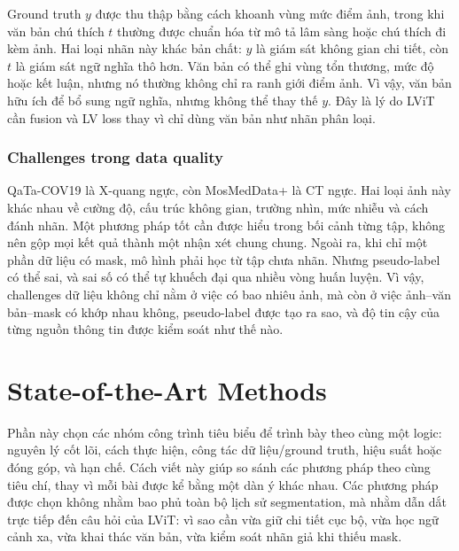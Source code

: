 Ground truth \(y\) được thu thập bằng cách khoanh vùng mức điểm ảnh, trong khi văn bản chú thích \(t\) thường được chuẩn hóa từ mô tả lâm sàng hoặc chú thích đi kèm ảnh. Hai loại nhãn này khác bản chất: \(y\) là giám sát không gian chi tiết, còn \(t\) là giám sát ngữ nghĩa thô hơn. Văn bản có thể ghi vùng tổn thương, mức độ hoặc kết luận, nhưng nó thường không chỉ ra ranh giới điểm ảnh. Vì vậy, văn bản hữu ích để bổ sung ngữ nghĩa, nhưng không thể thay thế \(y\). Đây là lý do LViT cần fusion và LV loss thay vì chỉ dùng văn bản như nhãn phân loại.

\subsubsection{Challenges trong data quality}

QaTa-COV19 là X-quang ngực, còn MosMedData+ là CT ngực. Hai loại ảnh này khác nhau về cường độ, cấu trúc không gian, trường nhìn, mức nhiễu và cách đánh nhãn. Một phương pháp tốt cần được hiểu trong bối cảnh từng tập, không nên gộp mọi kết quả thành một nhận xét chung chung. Ngoài ra, khi chỉ một phần dữ liệu có mask, mô hình phải học từ tập chưa nhãn. Nhưng pseudo-label có thể sai, và sai số có thể tự khuếch đại qua nhiều vòng huấn luyện. Vì vậy, challenges dữ liệu không chỉ nằm ở việc có bao nhiêu ảnh, mà còn ở việc ảnh--văn bản--mask có khớp nhau không, pseudo-label được tạo ra sao, và độ tin cậy của từng nguồn thông tin được kiểm soát như thế nào.

\section{State-of-the-Art Methods}

Phần này chọn các nhóm công trình tiêu biểu để trình bày theo cùng một logic: nguyên lý cốt lõi, cách thực hiện, công tác dữ liệu/ground truth, hiệu suất hoặc đóng góp, và hạn chế. Cách viết này giúp so sánh các phương pháp theo cùng tiêu chí, thay vì mỗi bài được kể bằng một dàn ý khác nhau. Các phương pháp được chọn không nhằm bao phủ toàn bộ lịch sử segmentation, mà nhằm dẫn dắt trực tiếp đến câu hỏi của LViT: vì sao cần vừa giữ chi tiết cục bộ, vừa học ngữ cảnh xa, vừa khai thác văn bản, vừa kiểm soát nhãn giả khi thiếu mask.

